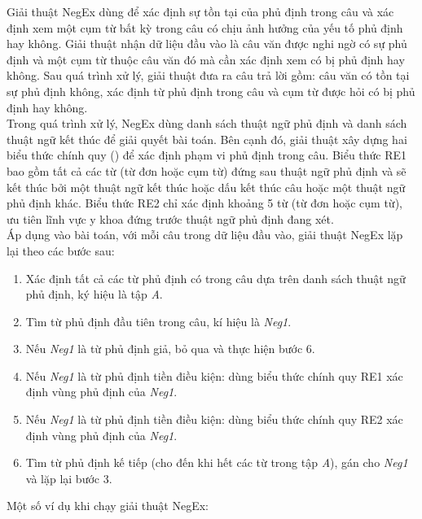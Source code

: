 Giải thuật NegEx dùng để xác định sự tồn tại của phủ định trong câu và xác định xem một cụm từ bất kỳ trong câu có chịu ảnh hưởng của yếu tố phủ định hay không. Giải thuật nhận dữ liệu đầu vào là câu văn được nghi ngờ có sự phủ định và một cụm từ thuộc câu văn đó mà cần xác định xem có bị phủ định hay không. Sau quá trình xử lý, giải thuật đưa ra câu trả lời gồm: câu văn có tồn tại sự phủ định không, xác định từ phủ định trong câu và cụm từ được hỏi có bị phủ định hay không.\\ 

Trong quá trình xử lý, NegEx dùng danh sách thuật ngữ phủ định và danh sách thuật ngữ kết thúc để giải quyết bài toán. Bên cạnh đó, giải thuật xây dựng hai biểu thức chính quy () để xác định phạm vi phủ định trong câu. Biểu thức RE1 bao gồm tất cả các từ (từ đơn hoặc cụm từ) đứng sau thuật ngữ phủ định và sẽ kết thúc bởi một thuật ngữ kết thúc hoặc dấu kết thúc câu hoặc một thuật ngữ phủ định khác. Biểu thức RE2 chỉ xác định khoảng 5 từ (từ đơn hoặc cụm từ), ưu tiên lĩnh vực y khoa đứng trước thuật ngữ phủ định đang xét. \\

Áp dụng vào bài toán, với mỗi câu trong dữ liệu đầu vào, giải thuật NegEx lặp lại theo các bước sau:

\begin{enumerate}
\item Xác định tất cả các từ phủ định có trong câu dựa trên danh sách thuật ngữ phủ định, ký hiệu là tập \textit{A}.
\item Tìm từ phủ định đầu tiên trong câu, kí hiệu là \textit{Neg1}.
\item Nếu \textit{Neg1} là từ phủ định giả, bỏ qua và thực hiện bước 6.
\item Nếu \textit{Neg1} là từ phủ định tiền điều kiện: dùng biểu thức chính quy RE1 xác định vùng phủ định của \textit{Neg1}.
\item Nếu \textit{Neg1} là từ phủ định tiền điều kiện: dùng biểu thức chính quy RE2 xác định vùng phủ định của \textit{Neg1}.
\item Tìm từ phủ định kế tiếp (cho đến khi hết các từ trong tập \textit{A}), gán cho \textit{Neg1} và lặp lại bước 3.
\end{enumerate}

Một số ví dụ khi chạy giải thuật NegEx:


